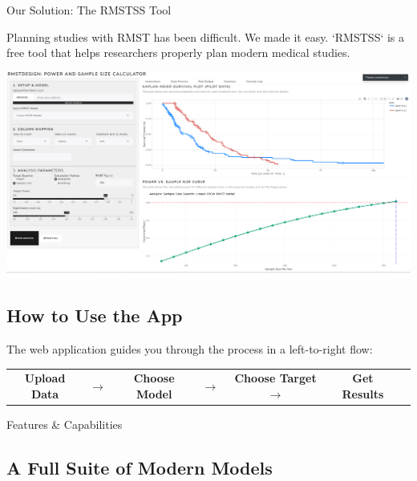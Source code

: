 \documentclass[a0,landscape]{a0poster}
\begin{document}
\begin{multicols}{3}
\columnbreak

\begin{posterbox}{Our Solution: The RMSTSS Tool}
    
    Planning studies with RMST has been difficult. We made it easy. `RMSTSS` is a free tool that helps researchers properly plan modern medical studies.
    
    \begin{center}
        \vspace{0.5cm}
        \includegraphics[width=0.9\linewidth]{app-ss.png}
        \vspace{0.5cm}
    \end{center}
    
    \subsection*{ How to Use the App}
    The web application guides you through the process in a left-to-right flow:
    \begin{center}
        
        \begin{tabular}{ccccccc}
            \textbf{Upload Data} &  $\boldsymbol{\rightarrow}$ & \textbf{Choose Model} &  $\boldsymbol{\rightarrow}$ & \textbf{Choose Target}  $\boldsymbol{\rightarrow}$ & \textbf{Get Results} \\
        \end{tabular}
    \end{center}
\end{posterbox}

\begin{posterbox}{Features \& Capabilities}
    \subsection*{ A Full Suite of Modern Models}
    

\end{posterbox}
\end{multicols}
\end{document}
